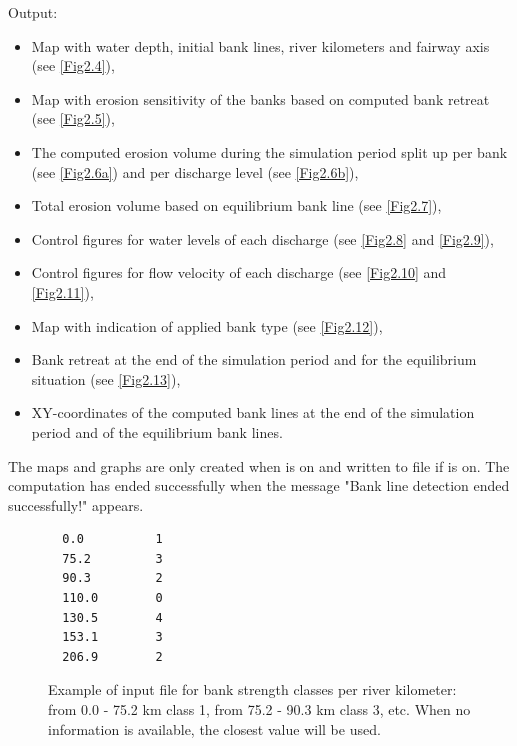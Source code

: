 Output:

\begin{itemize}
\item Map with water depth, initial bank lines, river kilometers and fairway axis (see \autoref{Fig2.4}),
\item Map with erosion sensitivity of the banks based on computed bank retreat (see \autoref{Fig2.5}),
\item The computed erosion volume during the simulation period split up per bank (see \autoref{Fig2.6a}) and per discharge level (see \autoref{Fig2.6b}),
\item Total erosion volume based on equilibrium bank line (see \autoref{Fig2.7}),
\item Control figures for water levels of each discharge (see \autoref{Fig2.8} and \autoref{Fig2.9}),
\item Control figures for flow velocity of each discharge (see \autoref{Fig2.10} and \autoref{Fig2.11}),
\item Map with indication of applied bank type (see \autoref{Fig2.12}),
\item Bank retreat at the end of the simulation period and for the equilibrium situation (see \autoref{Fig2.13}),
\item XY-coordinates of the computed bank lines at the end of the simulation period and of the equilibrium bank lines.
\end{itemize}

The maps and graphs are only created when  is on and written to file if  is on.
The computation has ended successfully when the message "Bank line detection ended successfully!" appears.

\begin{figure}
\begin{Verbatim}
  0.0          1
  75.2         3
  90.3         2
  110.0        0
  130.5        4
  153.1        3
  206.9        2
\end{Verbatim}
\caption{Example of input file for bank strength classes per river kilometer: from 0.0 - 75.2 km class 1, from 75.2 - 90.3 km class 3, etc.
When no information is available, the closest value will be used.}
\label{Fig2.3}
\end{figure}


